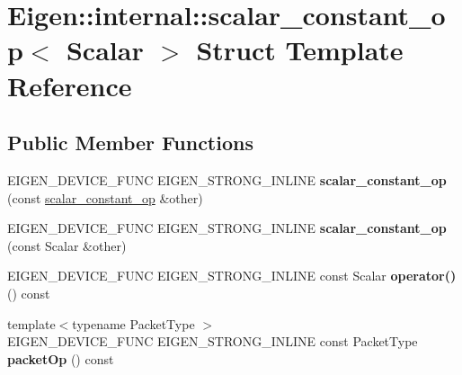 \hypertarget{struct_eigen_1_1internal_1_1scalar__constant__op}{}\section{Eigen\+::internal\+::scalar\+\_\+constant\+\_\+op$<$ Scalar $>$ Struct Template Reference}
\label{struct_eigen_1_1internal_1_1scalar__constant__op}
\subsection*{Public Member Functions}
\begin{DoxyCompactItemize}
\item 
\mbox{\label{struct_eigen_1_1internal_1_1scalar__constant__op_ab33f359bbcbe7a375f3e71ad62919cde}} 
E\+I\+G\+E\+N\+\_\+\+D\+E\+V\+I\+C\+E\+\_\+\+F\+U\+NC E\+I\+G\+E\+N\+\_\+\+S\+T\+R\+O\+N\+G\+\_\+\+I\+N\+L\+I\+NE {\bfseries scalar\+\_\+constant\+\_\+op} (const \mbox{\hyperlink{struct_eigen_1_1internal_1_1scalar__constant__op}{scalar\+\_\+constant\+\_\+op}} \&other)
\item 
\mbox{\label{struct_eigen_1_1internal_1_1scalar__constant__op_a40bf197abeae43e3478bdf1ca048a20d}} 
E\+I\+G\+E\+N\+\_\+\+D\+E\+V\+I\+C\+E\+\_\+\+F\+U\+NC E\+I\+G\+E\+N\+\_\+\+S\+T\+R\+O\+N\+G\+\_\+\+I\+N\+L\+I\+NE {\bfseries scalar\+\_\+constant\+\_\+op} (const Scalar \&other)
\item 
\mbox{\label{struct_eigen_1_1internal_1_1scalar__constant__op_a16de349a3938f7c7db6aac63c9619d41}} 
E\+I\+G\+E\+N\+\_\+\+D\+E\+V\+I\+C\+E\+\_\+\+F\+U\+NC E\+I\+G\+E\+N\+\_\+\+S\+T\+R\+O\+N\+G\+\_\+\+I\+N\+L\+I\+NE const Scalar {\bfseries operator()} () const
\item 
\mbox{\label{struct_eigen_1_1internal_1_1scalar__constant__op_a27e7079c0d1c983f98f2507d72d4c385}} 
{\footnotesize template$<$typename Packet\+Type $>$ }\\E\+I\+G\+E\+N\+\_\+\+D\+E\+V\+I\+C\+E\+\_\+\+F\+U\+NC E\+I\+G\+E\+N\+\_\+\+S\+T\+R\+O\+N\+G\+\_\+\+I\+N\+L\+I\+NE const Packet\+Type {\bfseries packet\+Op} () const
\end{DoxyCompactItemize}
